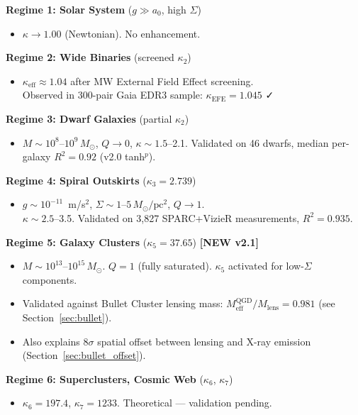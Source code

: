 \textbf{Regime 1: Solar System} ($g \gg a_0$, high $\Sigma$)
\begin{itemize}
	\item $\kappa \to 1.00$ (Newtonian). No enhancement.
\end{itemize}

\textbf{Regime 2: Wide Binaries} (screened $\kappa_2$)
\begin{itemize}
	\item $\kappa_{\text{eff}} \approx 1.04$ after MW External Field Effect screening. \\
	      Observed in 300-pair Gaia EDR3 sample: $\kappa_\text{EFE} = 1.045$ ✓
\end{itemize}

\textbf{Regime 3: Dwarf Galaxies} (partial $\kappa_2$)
\begin{itemize}
	\item $M \sim 10^8$--$10^9\,M_\odot$, $Q \to 0$, $\kappa \sim 1.5$--2.1.
	      Validated on 46 dwarfs, median per-galaxy $R^2 = 0.92$ (v2.0 tanh$^p$).
\end{itemize}

\textbf{Regime 4: Spiral Outskirts} ($\kappa_3 = 2.739$)
\begin{itemize}
	\item $g \sim 10^{-11}$~m/s$^2$, $\Sigma \sim 1$--$5\,M_\odot/\text{pc}^2$, $Q \to 1$. \\
	      $\kappa \sim 2.5$--3.5. Validated on 3,827 SPARC+VizieR measurements, $R^2 = 0.935$.
\end{itemize}

\textbf{Regime 5: Galaxy Clusters} ($\kappa_5 = 37.65$) \textbf{[NEW v2.1]}
\begin{itemize}
	\item $M \sim 10^{13}$--$10^{15}\,M_\odot$.
	      $Q = 1$ (fully saturated). $\kappa_5$ activated for low-$\Sigma$ components.
	\item Validated against Bullet Cluster lensing mass:
	      $M_\text{eff}^\text{QGD}/M_\text{lens} = 0.981$ (see Section~\ref{sec:bullet}).
	\item Also explains 8$\sigma$ spatial offset between lensing and X-ray emission
	      (Section~\ref{sec:bullet_offset}).
\end{itemize}

\textbf{Regime 6: Superclusters, Cosmic Web} ($\kappa_6$, $\kappa_7$)
\begin{itemize}
	\item $\kappa_6 = 197.4$, $\kappa_7 = 1233$. Theoretical — validation pending.
\end{itemize}

